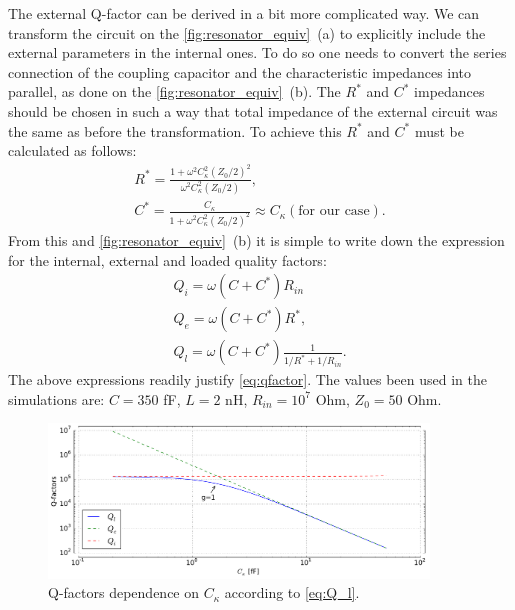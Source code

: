 \documentclass[12pt]{report}
\numberwithin{equation}{section}
\begin{document}
The external Q-factor can be derived in a bit more complicated way\cite{Goppl2008}. We can transform the circuit on the \autoref{fig:resonator_equiv}~(a) to explicitly include the external parameters in the internal ones. To do so one needs to convert the series connection of the coupling capacitor and the characteristic impedances into parallel, as done on the \autoref{fig:resonator_equiv}~(b). The $R^*$ and $C^*$ impedances should be chosen in such a way that total impedance of the external circuit was the same as before the transformation. To achieve this $R^*$ and $C^*$ must be calculated as follows:
\begin{gather}
R^{*} = \frac{1+\omega^2 C_\kappa^2 (Z_0/2)^2}{\omega^2 C_\kappa^2 (Z_0/2)	}, \\
C^{*} = \frac{C_\kappa}{1+\omega^2 C_\kappa^2 (Z_0/2)^2} \approx C_\kappa (\text{for our case}). \label{eq:C_ast}
\end{gather}
From this and \autoref{fig:resonator_equiv}~(b) it is simple to write down the expression for the internal, external and loaded quality factors:
\begin{gather}
Q_i =  \omega (C+C^{*}) R_{in}\\
Q_e = \omega (C+C^{*}) R^{*}, \\
Q_l = \omega (C+C^{*})  \frac{1}{1/R^{*}+1/R_{in}}. \label{eq:Q_l}
\end{gather}
The above expressions readily justify \eqref{eq:qfactor}. The values been used in the simulations are: $C = 350$ fF, $L = 2$ nH, $R_{in}=10^7$ Ohm, $Z_0 = 50$ Ohm. 


\begin{figure}
\centering
\includegraphics[width=0.9\textwidth]{q-factors}
\caption{Q-factors dependence on $C_\kappa$ according to \eqref{eq:Q_l}.}
\end{figure}
\end{document}
